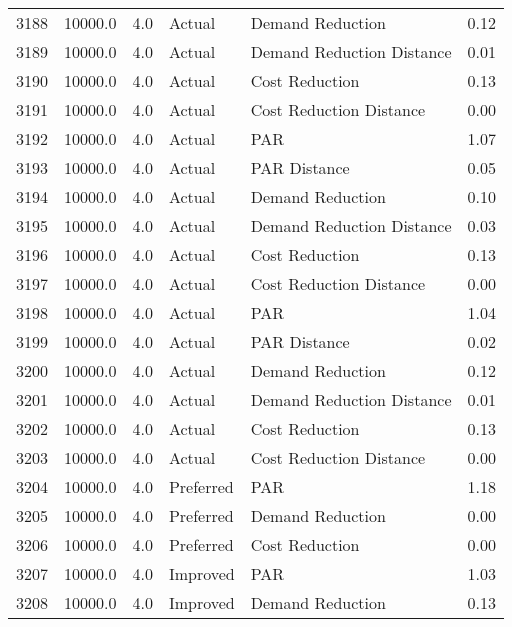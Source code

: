 \begin{longtable}{lrrllr}
3188 &      10000.0 &     4.0 &         Actual &           Demand Reduction &   0.12 \\
3189 &      10000.0 &     4.0 &         Actual &  Demand Reduction Distance &   0.01 \\
3190 &      10000.0 &     4.0 &         Actual &             Cost Reduction &   0.13 \\
3191 &      10000.0 &     4.0 &         Actual &    Cost Reduction Distance &   0.00 \\
3192 &      10000.0 &     4.0 &         Actual &                        PAR &   1.07 \\
3193 &      10000.0 &     4.0 &         Actual &               PAR Distance &   0.05 \\
3194 &      10000.0 &     4.0 &         Actual &           Demand Reduction &   0.10 \\
3195 &      10000.0 &     4.0 &         Actual &  Demand Reduction Distance &   0.03 \\
3196 &      10000.0 &     4.0 &         Actual &             Cost Reduction &   0.13 \\
3197 &      10000.0 &     4.0 &         Actual &    Cost Reduction Distance &   0.00 \\
3198 &      10000.0 &     4.0 &         Actual &                        PAR &   1.04 \\
3199 &      10000.0 &     4.0 &         Actual &               PAR Distance &   0.02 \\
3200 &      10000.0 &     4.0 &         Actual &           Demand Reduction &   0.12 \\
3201 &      10000.0 &     4.0 &         Actual &  Demand Reduction Distance &   0.01 \\
3202 &      10000.0 &     4.0 &         Actual &             Cost Reduction &   0.13 \\
3203 &      10000.0 &     4.0 &         Actual &    Cost Reduction Distance &   0.00 \\
3204 &      10000.0 &     4.0 &      Preferred &                        PAR &   1.18 \\
3205 &      10000.0 &     4.0 &      Preferred &           Demand Reduction &   0.00 \\
3206 &      10000.0 &     4.0 &      Preferred &             Cost Reduction &   0.00 \\
3207 &      10000.0 &     4.0 &       Improved &                        PAR &   1.03 \\
3208 &      10000.0 &     4.0 &       Improved &           Demand Reduction &   0.13 \\

\end{longtable}

